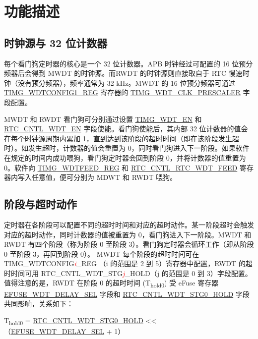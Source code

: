 \documentclass[main\_\_CN.tex]{subfiles}
\begin{document}
\section{功能描述}
\subsection{时钟源与 32 位计数器}

每个看门狗定时器的核心是一个 32 位计数器。APB 时钟经过可配置的 16 位预分频器后会得到 MWDT 的时钟源。而RWDT 的时钟源则直接取自于 RTC 慢速时钟（没有预分频器），频率通常为 32 kHz。MWDT 的 16 位预分频器可通过 \hyperref[regdesc:TIMGWDTCONFIG1REG]{TIMG\_WDTCONFIG1\_REG} 寄存器的 \hyperref[fielddesc:TIMGWDTCLKPRESCALER]{TIMG\_WDT\_CLK\_PRESCALER} 字段配置。

MWDT 和 RWDT 看门狗可分别通过设置 \hyperref[fielddesc:TIMGWDTEN]{TIMG\_WDT\_EN} 和 \hyperref[fielddesc:RTCCNTLWDTEN]{RTC\_CNTL\_WDT\_EN} 字段使能。看门狗使能后，其内部 32 位计数器的值会在每个时钟源周期内累加 1，直到达到该阶段的超时时间（即在该阶段发生超时）。如发生超时，计数器的值会重置为 0，同时看门狗进入下一阶段。如果软件在规定的时间内成功喂狗，看门狗定时器会回到阶段 0，并将计数器的值重置为 0。软件向 \hyperref[regdesc:TIMGWDTFEEDREG]{TIMG\_WDTFEED\_REG} 和 \hyperref[fielddesc:RTCCNTLRTCWDTFEED]{RTC\_CNTL\_RTC\_WDT\_FEED} 寄存器内写入任意值，便可分别为 MDWT 和 RWDT 喂狗。


\subsection{阶段与超时动作}
定时器在各阶段可以配置不同的超时时间和对应的超时动作。某一阶段超时会触发对应的超时动作，同时计数器的值被重置为 0，看门狗进入下一阶段。MWDT 和 RWDT 有四个阶段（称为阶段 0 至阶段 3）。看门狗定时器会循环工作（即从阶段 0 至阶段 3，再回到阶段 0）。
MWDT 每个阶段的超时时间可在 TIMG\_WDTCONFIG\textcolor{red}{\it{i}}\_REG （i 的范围是 2 到 5）寄存器中配置，RWDT 的超时时间可用 RTC\_CNTL\_WDT\_STG\textcolor{red}{\it{j}}\_HOLD（j 的范围是 0 到 3）字段配置。
值得注意的是，RWDT 在阶段 0 的超时时间 (T\textsubscript{hold0}) 受 eFuse 寄存器 \hyperref[fielddesc:EFUSEWDTDELAYSEL]{EFUSE\_WDT\_DELAY\_SEL} 字段和 \hyperref[fielddesc:RTCCNTLWDTSTG0HOLD]{RTC\_CNTL\_WDT\_STG0\_HOLD} 字段共同影响，关系如下：

T\textsubscript{hold0} = \hyperref[fielddesc:RTCCNTLWDTSTG0HOLD]{RTC\_CNTL\_WDT\_STG0\_HOLD}   << （\hyperref[fielddesc:EFUSEWDTDELAYSEL]{EFUSE\_WDT\_DELAY\_SEL} + 1）
\end{document}
